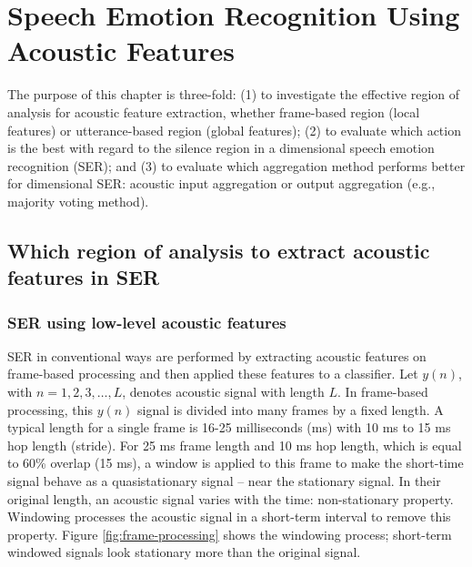 \chapter{Speech Emotion Recognition Using Acoustic Features}

The purpose of this chapter is three-fold: (1) to investigate the effective
region of analysis for acoustic feature extraction, whether frame-based region
(local features) or utterance-based region (global features); (2) to evaluate
which action is the best with regard to the silence region in a dimensional
speech emotion recognition (SER); and (3) to evaluate which aggregation method
performs better for dimensional SER: acoustic input aggregation or output
aggregation (e.g., majority voting method). 

\section{Which region of analysis to extract acoustic features in SER}
\subsection{SER using low-level acoustic features}
SER in conventional ways are performed by extracting acoustic features on
frame-based processing and then applied these features to a classifier. Let
$y(n)$, with $ n = 1, 2, 3, \ldots , L$, denotes acoustic signal with length
$L$.  In frame-based processing, this $y(n)$ signal is divided into many frames
by a fixed length. A typical length for a single frame is 16-25 milliseconds
(ms) with 10 ms to 15 ms hop length (stride). For 25 ms frame length and 10 ms
hop length, which is equal to 60\% overlap (15 ms), a window is applied to this
frame to make the short-time signal behave as a quasistationary signal -- near
the stationary signal. In their original length, an acoustic signal varies with
the time: non-stationary property.  Windowing processes the acoustic signal in
a short-term interval to remove this property. Figure
\ref{fig:frame-processing} shows the windowing process; short-term windowed
signals look stationary more than the original signal.


